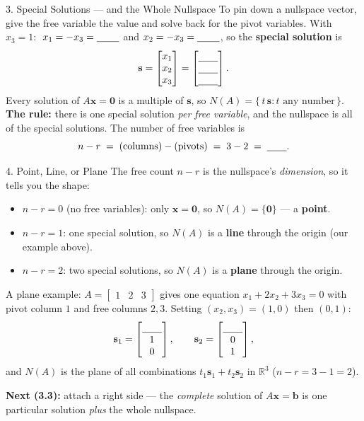 \documentclass[10pt]{article}
\newcommand{\xx}{\mathbf{x}}
\newcommand{\bb}{\mathbf{b}}
\newcommand{\svec}{\mathbf{s}}
\newcommand{\zero}{\mathbf{0}}
\begin{document}
\begin{notesbox}{3. Special Solutions --- and the Whole Nullspace}
To pin down a nullspace vector, give the free variable the value \blank{0.6cm} and solve back for the
pivot variables. With $x_3=1$: $\;x_1=-x_3=\blank{0.8cm}$ and $x_2=-x_3=\blank{0.8cm}$, so the
\textbf{special solution} is
\[
  \svec=\begin{bmatrix} x_1 \\ x_2 \\ x_3 \end{bmatrix}
  =\begin{bmatrix} \rule{0pt}{1.0em}\blank{0.7cm} \\ \blank{0.7cm} \\ \blank{0.7cm} \end{bmatrix}.
\]
Every solution of $A\xx=\zero$ is a multiple of $\svec$, so $N(A)=\{\,t\,\svec : t \text{ any number}\,\}$.
\textbf{The rule:} there is one special solution \emph{per free variable}, and the nullspace is all
\blank{2.6cm} of the special solutions. The number of free variables is
\[
  n-r \;=\; (\text{columns}) - (\text{pivots}) \;=\; 3 - 2 \;=\; \blank{0.7cm}.
\]
\end{notesbox}

\begin{notesbox}{4. Point, Line, or Plane}
The free count $n-r$ is the nullspace's \emph{dimension}, so it tells you the shape:
\begin{itemize}[leftmargin=1.5em, itemsep=2pt]
  \item $n-r=0$ (no free variables): only $\xx=\zero$, so $N(A)=\{\zero\}$ --- a \textbf{point}.
  \item $n-r=1$: one special solution, so $N(A)$ is a \textbf{line} through the origin (our example above).
  \item $n-r=2$: two special solutions, so $N(A)$ is a \textbf{plane} through the origin.
\end{itemize}
A plane example: $A=\begin{bmatrix} 1 & 2 & 3 \end{bmatrix}$ gives one equation $x_1+2x_2+3x_3=0$ with
pivot column $1$ and free columns $2,3$. Setting $(x_2,x_3)=(1,0)$ then $(0,1)$:
\[
  \svec_1=\begin{bmatrix} \rule{0pt}{1.0em}\blank{0.7cm} \\ 1 \\ 0 \end{bmatrix}, \qquad
  \svec_2=\begin{bmatrix} \rule{0pt}{1.0em}\blank{0.7cm} \\ 0 \\ 1 \end{bmatrix},
\]
and $N(A)$ is the plane of all combinations $t_1\svec_1+t_2\svec_2$ in $\mathbb{R}^3$ ($n-r=3-1=2$).

\vspace{3pt}
\textbf{Next (3.3):} attach a right side --- the \emph{complete} solution of $A\xx=\bb$ is one
particular solution \emph{plus} the whole nullspace.
\end{notesbox}
\end{document}
